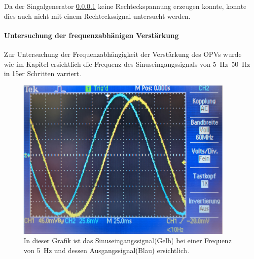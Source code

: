 \documentclass[12pt,english,ngerman]{scrartcl}
\begin{document}
Da der Singalgenerator \ref{} keine Rechteckspannung erzeugen konnte, konnte
dies auch nicht mit einem Rechteckssignal untersucht werden.


\paragraph{Untersuchung der frequenzabhänigen Verstärkung}
Zur Untersuchung der Frequenzabhängigkeit der Verstärkung des OPVs wurde wie im
Kapitel  ersichtlich die Frequenz des
Sinuseingangssignals von \SIrange{5}{50}{\hertz} in 15er Schritten varriert.

\begin{figure}[H]
  \centering
    \includegraphics[width=0.95\textwidth]{./figures/integrator/5hz.jpg}
    \caption{In dieser Grafik ist das Sinuseingangssignal(Gelb) bei einer Frequenz von
    \SI{5}{\Hz} und dessen Ausgangssignal(Blau) ersichtlich.}
  \label{fig:mess_integrator_5hz}
\end{figure}
\end{document}
